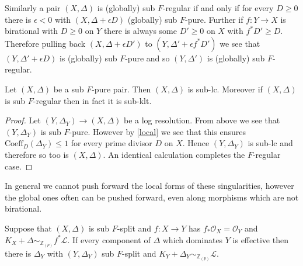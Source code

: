 \documentclass[a4paper,12pt]{book}
\newcommand{\ox}[1][X]{\mathcal{O}_{#1}}
\newcommand{\zp}{\mathbb{Z}_{(p)}}
\begin{document}
Similarly a pair $(X,\Delta)$ is (globally) sub $F$-regular if and only if for every $D \geq 0$ there is $\epsilon<0$ with $(X,\Delta+\epsilon D)$ (globally) sub $F$-pure. Further if $f:Y \to X$ is birational with $D \geq 0$ on $Y$ there is always some $D' \geq 0$ on $X$  with $f^{*}D' \geq D$. Therefore pulling back $(X,\Delta +\epsilon D')$ to $(Y,\Delta'+\epsilon f^{*}D')$ we see that  $(Y,\Delta'+\epsilon D)$ is (globally) sub $F$-pure and so $(Y,\Delta')$ is (globally) sub $F$-regular.


\begin{theorem}
	
	Let $(X,\Delta)$ be a sub $F$-pure pair. Then $(X,\Delta)$ is sub-lc. Moreover if $(X,\Delta)$ is sub $F$-regular then in fact it is sub-klt.
	
\end{theorem}

\begin{proof}
		Let $(Y,\Delta_{Y}) \to (X,\Delta)$ be a log resolution. From above we see that $(Y,\Delta_{Y})$ is sub $F$-pure. However by \autoref{local} we see that this ensures $\text{Coeff}_{D}(\Delta_{Y}) \leq 1$ for every prime divisor $D$ on $X$. Hence $(Y,\Delta_{Y})$ is sub-lc and therefore so too is $(X,\Delta)$. An identical calculation completes the $F$-regular case.
\end{proof}

In general we cannot push forward the local forms of these singularities, however the global ones often can be pushed forward, even along morphisms which are not birational.

\begin{lemma}
	Suppose that $(X,\Delta)$ is sub $F$-split and $f:X \to Y$ has $f_{*}\ox =\mathcal{O}_{Y}$ and $K_{X}+\Delta \sim_{\zp} f^{*}\mathcal{L}$. If every component of $\Delta$ which dominates $Y$ is effective then there is $\Delta_{Y}$ with $(Y,\Delta_{Y})$ sub $F$-split and $K_{Y}+\Delta_{Y} \sim_{\zp} \mathcal{L}$.
\end{lemma}
\end{document}
